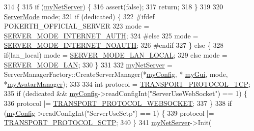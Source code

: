 \begin{DoxyCode}
314 \{
315     \textcolor{keywordflow}{if} (\hyperlink{class_session_a0f513f8d52d5026a3c449738da984c29}{myNetServer}) \{
316         assert(\textcolor{keyword}{false});
317         \textcolor{keywordflow}{return};
318     \}
319 
320     \hyperlink{game__defs_8h_a0c3cbd252a209f92f14db7a3d59a3956}{ServerMode} mode;
321     \textcolor{keywordflow}{if} (dedicated) \{
322 \textcolor{preprocessor}{#ifdef POKERTH\_OFFICIAL\_SERVER
}
323 \textcolor{preprocessor}{}        mode = \hyperlink{game__defs_8h_a0c3cbd252a209f92f14db7a3d59a3956ad30e94a28f96a66c0d063ecd5ec237bb}{SERVER\_MODE\_INTERNET\_AUTH};
324 \textcolor{preprocessor}{#else
}
325 \textcolor{preprocessor}{}        mode = \hyperlink{game__defs_8h_a0c3cbd252a209f92f14db7a3d59a3956a7dffad0c975963f9853e2aba9bc4b156}{SERVER\_MODE\_INTERNET\_NOAUTH};
326 \textcolor{preprocessor}{#endif
}
327 \textcolor{preprocessor}{}    \} \textcolor{keywordflow}{else} \{
328         \textcolor{keywordflow}{if}(lan\_local) mode = \hyperlink{game__defs_8h_a0c3cbd252a209f92f14db7a3d59a3956a2da97b4ed0833f737a1b67567b8b7f76}{SERVER\_MODE\_LAN\_LOCAL};
329         \textcolor{keywordflow}{else} mode = \hyperlink{game__defs_8h_a0c3cbd252a209f92f14db7a3d59a3956a3f545f4f97970f80049cbbcafb0a565f}{SERVER\_MODE\_LAN};
330     \}
331 
332     \hyperlink{class_session_a0f513f8d52d5026a3c449738da984c29}{myNetServer} = ServerManagerFactory::CreateServerManager(*\hyperlink{class_session_a5bfbe43c623b688e7def57e02704033f}{myConfig}, *
      \hyperlink{class_session_a2725f4b56b109b2e7d75ed780d24fa6d}{myGui}, mode, *\hyperlink{class_session_a53231528d2b4c4babd97c7d1194a5f7e}{myAvatarManager});
333 
334     \textcolor{keywordtype}{int} protocol = \hyperlink{game__defs_8h_a16586aece3f2351978656f88132b23fcadd18d6cbb60ab77047bbb55a93cd82b8}{TRANSPORT\_PROTOCOL\_TCP};
335     \textcolor{keywordflow}{if} (dedicated && \hyperlink{class_session_a5bfbe43c623b688e7def57e02704033f}{myConfig}->readConfigInt(\textcolor{stringliteral}{"ServerUseWebSocket"}) == 1) \{
336         protocol |= \hyperlink{game__defs_8h_a16586aece3f2351978656f88132b23fca6c97945151581eabf3e61a835f68f53d}{TRANSPORT\_PROTOCOL\_WEBSOCKET};
337     \}
338     \textcolor{keywordflow}{if} (\hyperlink{class_session_a5bfbe43c623b688e7def57e02704033f}{myConfig}->readConfigInt(\textcolor{stringliteral}{"ServerUseSctp"}) == 1) \{
339         protocol |= \hyperlink{game__defs_8h_a16586aece3f2351978656f88132b23fca2f9ad9f5989b295874a0072e784fc833}{TRANSPORT\_PROTOCOL\_SCTP};
340     \}
341     \hyperlink{class_session_a0f513f8d52d5026a3c449738da984c29}{myNetServer}->Init(

\end{DoxyCode}
